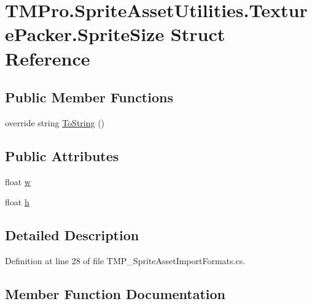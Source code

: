 \hypertarget{struct_t_m_pro_1_1_sprite_asset_utilities_1_1_texture_packer_1_1_sprite_size}{}\section{T\+M\+Pro.\+Sprite\+Asset\+Utilities.\+Texture\+Packer.\+Sprite\+Size Struct Reference}
\label{struct_t_m_pro_1_1_sprite_asset_utilities_1_1_texture_packer_1_1_sprite_size}
\subsection*{Public Member Functions}
\begin{DoxyCompactItemize}
\item 
override string \mbox{\hyperlink{struct_t_m_pro_1_1_sprite_asset_utilities_1_1_texture_packer_1_1_sprite_size_af54cf9af15ab56f64cdeca9151ba8e17}{To\+String}} ()
\end{DoxyCompactItemize}
\subsection*{Public Attributes}
\begin{DoxyCompactItemize}
\item 
float \mbox{\hyperlink{struct_t_m_pro_1_1_sprite_asset_utilities_1_1_texture_packer_1_1_sprite_size_a19f6e2bae8ee08ffcb71ec372d724431}{w}}
\item 
float \mbox{\hyperlink{struct_t_m_pro_1_1_sprite_asset_utilities_1_1_texture_packer_1_1_sprite_size_aeb0d76a4cf8c681d82d01f9841f21aa4}{h}}
\end{DoxyCompactItemize}


\subsection{Detailed Description}


Definition at line 28 of file T\+M\+P\+\_\+\+Sprite\+Asset\+Import\+Formats.\+cs.



\subsection{Member Function Documentation}
\mbox{\label{struct_t_m_pro_1_1_sprite_asset_utilities_1_1_texture_packer_1_1_sprite_size_af54cf9af15ab56f64cdeca9151ba8e17}} 
